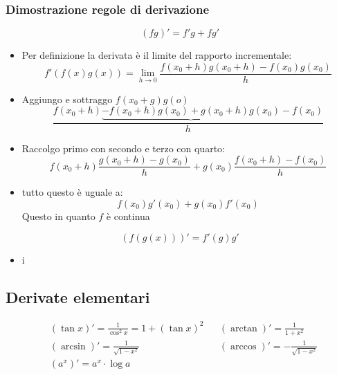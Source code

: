 \subsubsection{Dimostrazione regole di derivazione}
\[
	\boxed{	\left( fg \right) ' =  f'g + fg'}
\]
\begin{itemize}
	\item Per definizione la derivata è il limite del rapporto incrementale:
		\[
			f'\left( f\left( x \right) g\left( x \right)  \right) = \lim_{h \to 0} \frac{f\left( x_0 +h \right) g\left( x_0+h \right) - f\left( x_0 \right) g\left( x_0 \right) }{h} 
		\] 
	\item Aggiungo e sottraggo $f\left( x_0 +g \right) g\left( o \right) $ 
		\[
			\frac{f\left( x_0+h \right) \underbrace{- f\left( x_0 + h \right) g\left( x_0 \right) + g\left( x_0 + h \right) g\left( x_0 \right)} - f\left( x_0 \right) }{h}
		\] 
	\item Raccolgo primo con secondo e terzo con quarto:
		\[
			f\left( x_0 + h \right) \frac{g\left( x_0 +h \right) - g\left( x_0 \right) }{h} + g\left( x_0 \right) \frac{f\left( x_0 + h \right) - f\left( x_0 \right) }{h}
		\] 
	\item tutto questo è uguale a: 
		\[
			f\left( x_0 \right) g' \left( x_0 \right) + g\left( x_0 \right) f'\left( x_0 \right) 
		\] 
		Questo in quanto $f$ è continua
\end{itemize}
\[
	\boxed{	\left( f\left( g\left( x \right)   \right)  \right) '  =  f'\left( g \right) g'}
\]
\begin{itemize}
	\item 
	i
\end{itemize}
\subsection{Derivate elementari}
\begin{align*}
	&\left( \tan x \right) ' = \frac{1}{\cos ^2 x}=  1 + \left( \tan x \right) ^2 && \left( \arctan  \right) ' =  \frac{1}{1+x^2}\\
	&\left( \arcsin \right) ' =  \frac{1}{\sqrt{1-x^2} }  &&\left( \arccos \right) ' =  -\frac{1}{\sqrt{1-x^2} }\\
	&\left( a^{x} \right) ' =  a^{x} \cdot \log a  
\end{align*}
